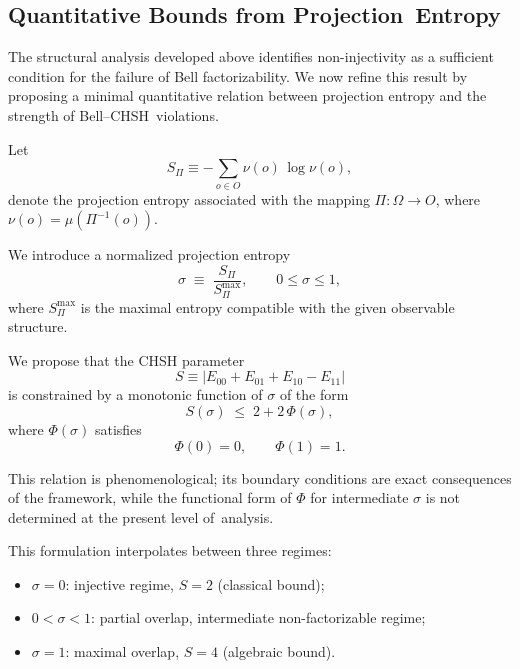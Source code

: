 \documentclass[quantumrep,article,accept,pdftex,oneauthor]{Definitions/mdpi}
\theoremstyle{remark}
\begin{document}
   \subsection{Quantitative Bounds from Projection~Entropy}
  \label{subsec:projection-entropy-bound}

  The structural analysis developed above identifies non-injectivity as a sufficient
  condition for the failure of Bell factorizability.
  We now refine this result by proposing a minimal quantitative relation between
  projection entropy and the strength of Bell--CHSH~violations.

  Let
\begin{equation}
    S_{\Pi} \equiv - \sum_{o \in O} \nu(o)\,\log \nu(o),
  \end{equation}
  denote the projection entropy associated with the mapping $\Pi : \Omega \to O$,
  where $\nu(o) = \mu(\Pi^{-1}(o))$.

  We introduce a normalized projection entropy
\begin{equation}
    \sigma \;\equiv\; \frac{S_{\Pi}}{S_{\Pi}^{\max}},
    \qquad 0 \le \sigma \le 1,
  \end{equation}
  where $S_{\Pi}^{\max}$ is the maximal entropy compatible with the given observable
  structure.

  We propose that the CHSH parameter
\begin{equation}
    S \equiv |E_{00} + E_{01} + E_{10} - E_{11}|
  \end{equation}
  is constrained by a monotonic function of $\sigma$ of the form
\begin{equation}
    S(\sigma) \;\leq\; 2 + 2\,\Phi(\sigma),
    \label{eq:general-bound}
  \end{equation}
  where $\Phi(\sigma)$ satisfies
\begin{equation}
    \Phi(0) = 0, \qquad \Phi(1) = 1.
  \end{equation}

  This relation is phenomenological; its boundary conditions are exact
  consequences of the framework, while the functional form of $\Phi$ for
  intermediate $\sigma$ is not determined at the present level of~analysis.

  This formulation interpolates between three regimes:

  \begin{itemize}
    \item $\sigma = 0$: injective regime, $S = 2$ (classical bound);
    \item $0 < \sigma < 1$: partial overlap, intermediate non-factorizable regime;
    \item $\sigma = 1$: maximal overlap, $S = 4$ (algebraic bound).
  \end{itemize}
\end{document}
